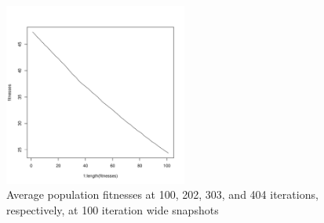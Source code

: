 \documentclass[12pt]{article}
\begin{document}
\begin{figure}[!h]
\begin{center}
		\includegraphics[width=60mm]{images/spherical.ss/avg_404.pdf}
               	\caption{Average population fitnesses at 100, 202, 303, and 404 iterations, respectively, at 100 iteration wide snapshots}
                \label{spherical_ss_avg_pop_fit}
        \end{center}
\end{figure}


\pagebreak
\end{document}
